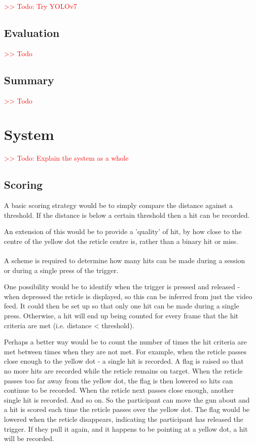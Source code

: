 \documentclass[final]{cmpreport_02}
\begin{document}
\noindent
\textcolor{red}{>> Todo: Try YOLOv7}

\subsection{Evaluation}

\textcolor{red}{>> Todo}

\subsection{Summary}

\textcolor{red}{>> Todo}


\section{System}

\textcolor{red}{>> Todo: Explain the system as a whole}

\subsection{Scoring}

A basic scoring strategy would be to simply compare the distance against a threshold. If the distance is below a certain threshold then a hit can be recorded.

An extension of this would be to provide a 'quality' of hit, by how close to the centre of the yellow dot the reticle centre is, rather than a binary hit or miss.
\\\\
A scheme is required to determine how many hits can be made during a session or during a single press of the trigger.

One possibility would be to identify when the trigger is pressed and released - when depressed the reticle is displayed, so this can be inferred from just the video feed. It could then be set up so that only one hit can be made during a single press. Otherwise, a hit will end up being counted for every frame that the hit criteria are met (i.e. distance < threshold).

Perhaps a better way would be to count the number of times the hit criteria are met between times when they are not met. For example, when the reticle passes close enough to the yellow dot - a single hit is recorded. A flag is raised so that no more hits are recorded while the reticle remains on target. When the reticle passes too far away from the yellow dot, the flag is then lowered so hits can continue to be recorded. When the reticle next passes close enough, another single hit is recorded. And so on. So the participant can move the gun about and a hit is scored each time the reticle passes over the yellow dot. The flag would be lowered when the reticle disappears, indicating the participant has released the trigger. If they pull it again, and it happens to be pointing at a yellow dot, a hit will be recorded.
\end{document}
